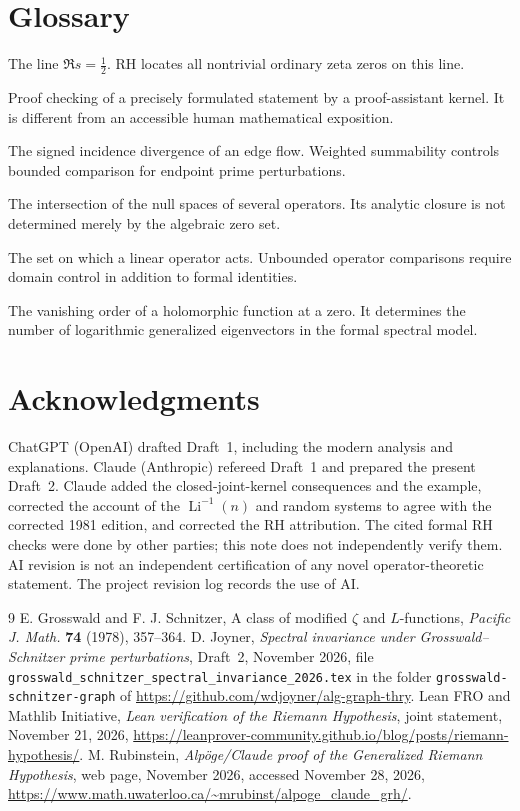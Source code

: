\documentclass[12pt,letterpaper]{article}
\numberwithin{equation}{section}
\theoremstyle{definition}
\begin{document}
\section{Glossary}
\begin{description}[style=nextline,leftmargin=1.5em]
\item[Critical line] The line $\Re s=\tfrac12$. RH locates
all nontrivial ordinary zeta zeros on this line.
\item[Formal verification] Proof checking of a precisely
formulated statement by a proof-assistant kernel. It is
different from an accessible human mathematical exposition.
\item[Graph boundary] The signed incidence divergence of
an edge flow. Weighted summability controls bounded comparison
for endpoint prime perturbations.
\item[Joint kernel] The intersection of the null spaces of
several operators. Its analytic closure is not determined merely
by the algebraic zero set.
\item[Operator domain] The set on which a linear operator acts.
Unbounded operator comparisons require domain control in
addition to formal identities.
\item[Zero multiplicity] The vanishing order of a holomorphic
function at a zero. It determines the number of logarithmic
generalized eigenvectors in the formal spectral model.
\end{description}
\section*{Acknowledgments}
ChatGPT (OpenAI) drafted Draft~1, including the modern analysis and
explanations.  Claude (Anthropic) refereed Draft~1 and prepared the
present Draft~2.  Claude added the closed-joint-kernel consequences and
the example, corrected the account of the $\operatorname{Li}^{-1}(n)$ and
random systems to agree with the corrected 1981 edition, and corrected
the RH attribution.
The cited formal RH checks were done by other parties; this
note does not independently verify them. AI revision is not
an independent certification of any novel operator-theoretic
statement. The project revision log records the use of AI.
\begin{thebibliography}{9}
 E. Grosswald and F. J. Schnitzer,
A class of modified $\zeta$ and $L$-functions,
\emph{Pacific J. Math.} \textbf{74} (1978), 357--364.
 D. Joyner, \emph{Spectral invariance under Grosswald--Schnitzer
prime perturbations}, Draft~2, November 2026, file \texttt{grosswald\_schnitzer\_spectral\_invariance\_2026.tex}
in the folder \texttt{grosswald-schnitzer-graph} of
\url{https://github.com/wdjoyner/alg-graph-thry}.
 Lean FRO and Mathlib Initiative,
\emph{Lean verification of the Riemann Hypothesis},
joint statement, November 21, 2026,
\url{https://leanprover-community.github.io/blog/posts/riemann-hypothesis/}.
 M. Rubinstein,
\emph{Alp\"oge/Claude proof of the Generalized Riemann Hypothesis},
web page, November 2026, accessed November 28, 2026,
\url{https://www.math.uwaterloo.ca/~mrubinst/alpoge_claude_grh/}.
\end{thebibliography}
\end{document}
